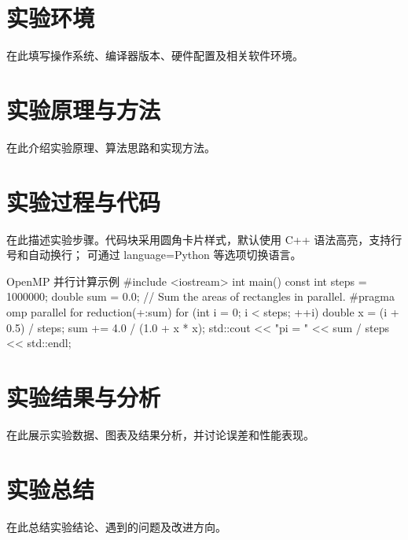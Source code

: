 \documentclass[UTF8,a4paper,fontset=none,zihao=-4]{ctexart}
\begin{document}
\section{实验环境}
在此填写操作系统、编译器版本、硬件配置及相关软件环境。

\section{实验原理与方法}
在此介绍实验原理、算法思路和实现方法。

\section{实验过程与代码}
在此描述实验步骤。代码块采用圆角卡片样式，默认使用 C++ 语法高亮，支持行号和自动换行；
可通过 language=Python 等选项切换语言。

\begin{reportcode}[language=C++]{OpenMP 并行计算示例}
#include <iostream>
int main() {
    const int steps = 1000000; double sum = 0.0;
    // Sum the areas of rectangles in parallel.
    #pragma omp parallel for reduction(+:sum)
    for (int i = 0; i < steps; ++i) {
        double x = (i + 0.5) / steps;
        sum += 4.0 / (1.0 + x * x);
    }
    std::cout << "pi = " << sum / steps << std::endl;
}
\end{reportcode}

\section{实验结果与分析}
在此展示实验数据、图表及结果分析，并讨论误差和性能表现。

\section{实验总结}
在此总结实验结论、遇到的问题及改进方向。
\end{document}
